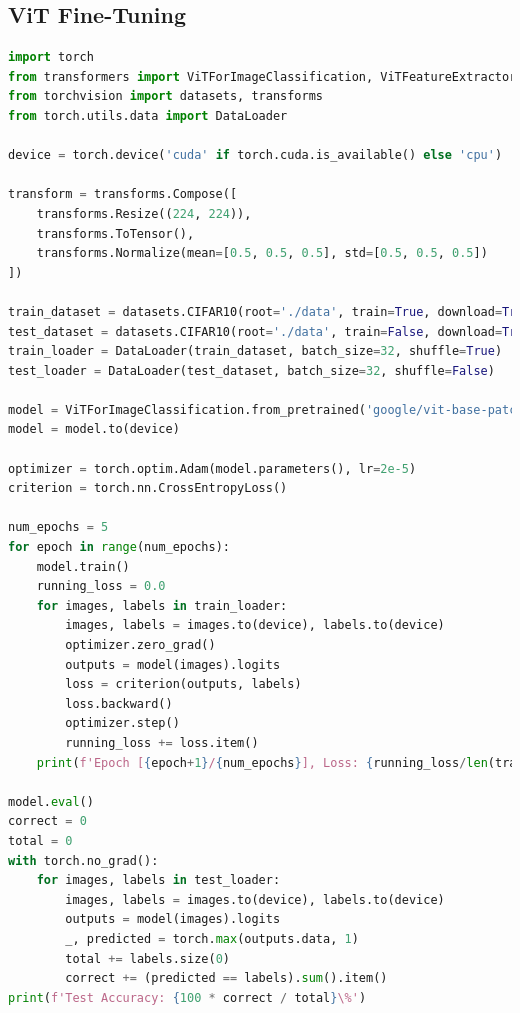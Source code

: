 \documentclass[UTF8]{report}
\theoremstyle{MyLineTheoremStyle} %
\theoremstyle{MyBlockTheoremStyle} %
\theoremstyle{MySubsubsectionStyle} %
\begin{document}
\subsection*{ViT Fine-Tuning}
\begin{lstlisting}[language=Python]
import torch
from transformers import ViTForImageClassification, ViTFeatureExtractor
from torchvision import datasets, transforms
from torch.utils.data import DataLoader

device = torch.device('cuda' if torch.cuda.is_available() else 'cpu')

transform = transforms.Compose([
    transforms.Resize((224, 224)),
    transforms.ToTensor(),
    transforms.Normalize(mean=[0.5, 0.5, 0.5], std=[0.5, 0.5, 0.5])
])

train_dataset = datasets.CIFAR10(root='./data', train=True, download=True, transform=transform)
test_dataset = datasets.CIFAR10(root='./data', train=False, download=True, transform=transform)
train_loader = DataLoader(train_dataset, batch_size=32, shuffle=True)
test_loader = DataLoader(test_dataset, batch_size=32, shuffle=False)

model = ViTForImageClassification.from_pretrained('google/vit-base-patch16-224-in21k', num_labels=10)
model = model.to(device)

optimizer = torch.optim.Adam(model.parameters(), lr=2e-5)
criterion = torch.nn.CrossEntropyLoss()

num_epochs = 5
for epoch in range(num_epochs):
    model.train()
    running_loss = 0.0
    for images, labels in train_loader:
        images, labels = images.to(device), labels.to(device)
        optimizer.zero_grad()
        outputs = model(images).logits
        loss = criterion(outputs, labels)
        loss.backward()
        optimizer.step()
        running_loss += loss.item()
    print(f'Epoch [{epoch+1}/{num_epochs}], Loss: {running_loss/len(train_loader):.4f}')

model.eval()
correct = 0
total = 0
with torch.no_grad():
    for images, labels in test_loader:
        images, labels = images.to(device), labels.to(device)
        outputs = model(images).logits
        _, predicted = torch.max(outputs.data, 1)
        total += labels.size(0)
        correct += (predicted == labels).sum().item()
print(f'Test Accuracy: {100 * correct / total}\%')
\end{lstlisting}
\end{document}

